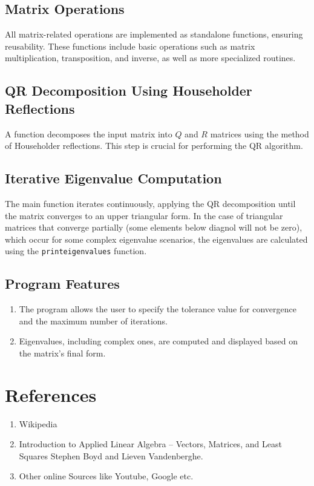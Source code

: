 \documentclass[12pt]{article}
\begin{document}
\subsection{Matrix Operations}
All matrix-related operations are implemented as standalone functions, ensuring  reusability. These functions include basic operations such as matrix multiplication, transposition, and inverse, as well as more specialized routines.

\subsection{QR Decomposition Using Householder Reflections}
A  function decomposes the input matrix into \( Q \) and \( R \) matrices using the method of Householder reflections. This step is crucial for performing the QR algorithm.

\subsection{Iterative Eigenvalue Computation}
The main function iterates continuously, applying the QR decomposition until the matrix converges to an upper triangular  form. In the case of  triangular matrices that converge partially (some elements below diagnol will not be zero), which occur for some complex eigenvalue scenarios, the eigenvalues are calculated using the \texttt{printeigenvalues} function.

\subsection{Program Features}
\begin{enumerate}
    \item The program allows the user to specify the tolerance value for convergence and the maximum number of iterations.
    \item Eigenvalues, including complex ones, are computed and displayed based on the matrix's final form.
   
\end{enumerate}


\section*{References}
\begin{enumerate}
    \item Wikipedia
    \item Introduction to Applied Linear Algebra – Vectors, Matrices, and Least Squares
Stephen Boyd and Lieven Vandenberghe.
    \item Other online Sources like Youtube, Google etc.
\end{enumerate}
\end{document}
